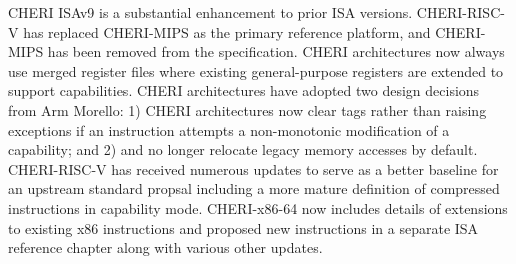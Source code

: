 CHERI ISAv9 is a substantial enhancement to prior ISA versions.
CHERI-RISC-V has replaced CHERI-MIPS as the primary reference
platform, and CHERI-MIPS has been removed from the specification.
CHERI architectures now always use merged register files where
existing general-purpose registers are extended to support
capabilities.
CHERI architectures have adopted two design decisions from Arm
Morello: 1) CHERI architectures now clear tags rather than raising
exceptions if an instruction attempts a non-monotonic modification
of a capability; and 2) \DDC{} and \PCC{} no longer relocate legacy
memory accesses by default.
CHERI-RISC-V has received numerous updates to serve as a better
baseline for an upstream standard propsal including a more mature
definition of compressed instructions in capability mode.
CHERI-x86-64 now includes details of extensions to existing x86
instructions and proposed new instructions in a separate ISA
reference chapter along with various other updates.
